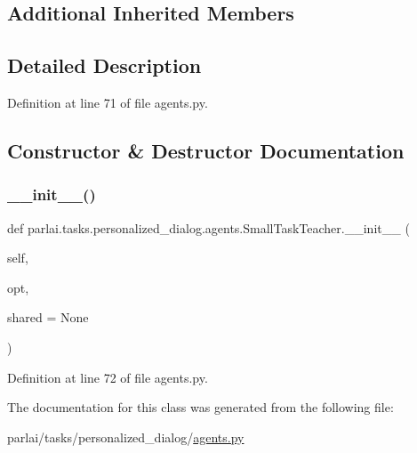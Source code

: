 \subsection*{Additional Inherited Members}


\subsection{Detailed Description}


Definition at line 71 of file agents.\+py.



\subsection{Constructor \& Destructor Documentation}
\mbox{\label{classparlai_1_1tasks_1_1personalized__dialog_1_1agents_1_1SmallTaskTeacher_a2e707f17a77f97a8a04ee9737d627209}} 
\subsubsection{\texorpdfstring{\+\_\+\+\_\+init\+\_\+\+\_\+()}{\_\_init\_\_()}}
{\footnotesize\ttfamily def parlai.\+tasks.\+personalized\+\_\+dialog.\+agents.\+Small\+Task\+Teacher.\+\_\+\+\_\+init\+\_\+\+\_\+ (\begin{DoxyParamCaption}\item[{}]{self,  }\item[{}]{opt,  }\item[{}]{shared = {\ttfamily None} }\end{DoxyParamCaption})}



Definition at line 72 of file agents.\+py.



The documentation for this class was generated from the following file\+:\begin{DoxyCompactItemize}
\item 
parlai/tasks/personalized\+\_\+dialog/\hyperlink{parlai_2tasks_2personalized__dialog_2agents_8py}{agents.\+py}\end{DoxyCompactItemize}
